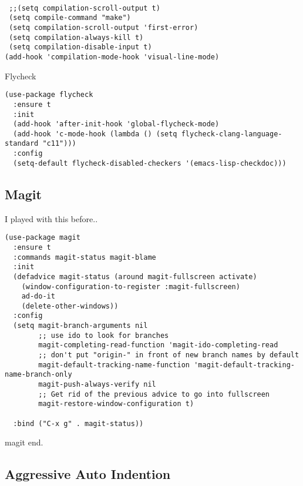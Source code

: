 \documentclass[12pt]{article}
\begin{document}
\lstset{language=Lisp,label= ,caption= ,captionpos=b,numbers=none}
\begin{lstlisting}

 ;;(setq compilation-scroll-output t)
 (setq compile-command "make")
 (setq compilation-scroll-output 'first-error)
 (setq compilation-always-kill t)
 (setq compilation-disable-input t)
(add-hook 'compilation-mode-hook 'visual-line-mode)

\end{lstlisting}

Flycheck 
\lstset{language=Lisp,label= ,caption= ,captionpos=b,numbers=none}
\begin{lstlisting}
(use-package flycheck
  :ensure t
  :init
  (add-hook 'after-init-hook 'global-flycheck-mode)
  (add-hook 'c-mode-hook (lambda () (setq flycheck-clang-language-standard "c11")))
  :config
  (setq-default flycheck-disabled-checkers '(emacs-lisp-checkdoc)))

\end{lstlisting}
\subsection{Magit}
\label{sec:org3556a34}

I played with this before.. 

\lstset{language=Lisp,label= ,caption= ,captionpos=b,numbers=none}
\begin{lstlisting}
(use-package magit
  :ensure t
  :commands magit-status magit-blame
  :init
  (defadvice magit-status (around magit-fullscreen activate)
    (window-configuration-to-register :magit-fullscreen)
    ad-do-it
    (delete-other-windows))
  :config
  (setq magit-branch-arguments nil
        ;; use ido to look for branches
        magit-completing-read-function 'magit-ido-completing-read
        ;; don't put "origin-" in front of new branch names by default
        magit-default-tracking-name-function 'magit-default-tracking-name-branch-only
        magit-push-always-verify nil
        ;; Get rid of the previous advice to go into fullscreen
        magit-restore-window-configuration t)

  :bind ("C-x g" . magit-status))

\end{lstlisting}

magit end. 
\subsection{Aggressive Auto Indention}
\label{sec:org64c39b2}
\end{document}
